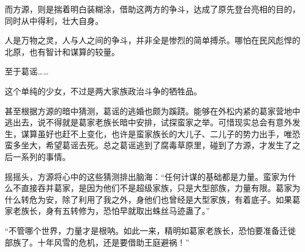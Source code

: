 \begin{this_body}
而方源，则是揣着明白装糊涂，借助这两方的争斗，达成了原先登台亮相的目的，同时从中得利，壮大自身。

人是万物之灵，人与人之间的争斗，并非全是惨烈的简单搏杀。哪怕在民风彪悍的北原，也有智计和谋算的较量。

至于葛谣……

这个单纯的少女，不过是两大家族政治斗争的牺牲品。

甚至根据方源的暗中猜测，葛谣的逃婚也颇为蹊跷。能够在外松内紧的葛家营地中逃出去，说不得就是葛家老族长暗中安排，试探蛮家之举。可惜现实总会有意外发生，谋算虽好也赶不上变化，也许是蛮家族长的大儿子、二儿子的势力出手，唯恐蛮多坐大，希望葛谣去死。总之葛谣逃到了腐毒草原里，碰到了方源，才发生了之后一系列的事情。

摇摇头，方源将心中的这些猜测排出脑海：“任何计谋的基础都是力量。蛮家为什么不直接吞并葛家，是因为他们不是超级家族，只是大型部族，力量有限。葛家为什么转危为安，除了利用了我之外，身他们也曾经是大型家族，有着底子。如果葛家老族长，身有五转修为，恐怕早就取出蛛丝马迹蛊了。”

“不管哪个世界，力量才是根呐。如此一来，精明如葛家老族长，恐怕要准备迁徙部族了。十年风雪的危机，还是要借助王庭避祸！”

\end{this_body}

